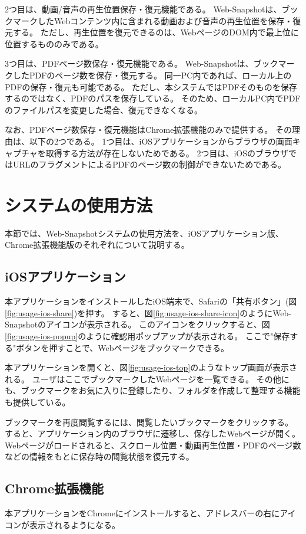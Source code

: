 2つ目は、動画/音声の再生位置保存・復元機能である。
Web-Snapshotは、ブックマークしたWebコンテンツ内に含まれる動画および音声の再生位置を保存・復元する。
ただし、再生位置を復元できるのは、WebページのDOM内で最上位に位置するもののみである。

3つ目は、PDFページ数保存・復元機能である。
Web-Snapshotは、ブックマークしたPDFのページ数を保存・復元する。
同一PC内であれば、ローカル上のPDFの保存・復元も可能である。
ただし、本システムではPDFそのものを保存するのではなく、PDFのパスを保存している。
そのため、ローカルPC内でPDFのファイルパスを変更した場合、復元できなくなる。

なお、PDFページ数保存・復元機能はChrome拡張機能のみで提供する。
その理由は、以下の2つである。
1つ目は、iOSアプリケーションからブラウザの画面キャプチャを取得する方法が存在しないためである。
2つ目は、iOSのブラウザではURLのフラグメントによるPDFのページ数の制御ができないためである。

\section{システムの使用方法}
本節では、Web-Snapshotシステムの使用方法を、iOSアプリケーション版、Chrome拡張機能版のそれぞれについて説明する。

\subsection{iOSアプリケーション}
本アプリケーションをインストールしたiOS端末で、Safariの「共有ボタン」(図\ref{fig:usage-ios-share})を押す。
すると、図\ref{fig:usage-ios-share-icon}のようにWeb-Snapshotのアイコンが表示される。
このアイコンをクリックすると、図\ref{fig:usage-ios-popup}のように確認用ポップアップが表示される。
ここで"保存する"ボタンを押すことで、Webページをブックマークできる。

本アプリケーションを開くと、図\ref{fig:usage-ios-top}のようなトップ画面が表示される。
ユーザはここでブックマークしたWebページを一覧できる。
その他にも、ブックマークをお気に入りに登録したり、フォルダを作成して整理する機能も提供している。

ブックマークを再度閲覧するには、閲覧したいブックマークをクリックする。
すると、アプリケーション内のブラウザに遷移し、保存したWebページが開く。
Webページがロードされると、スクロール位置・動画再生位置・PDFのページ数などの情報をもとに保存時の閲覧状態を復元する。

\subsection{Chrome拡張機能}
本アプリケーションをChromeにインストールすると、アドレスバーの右にアイコンが表示されるようになる。

